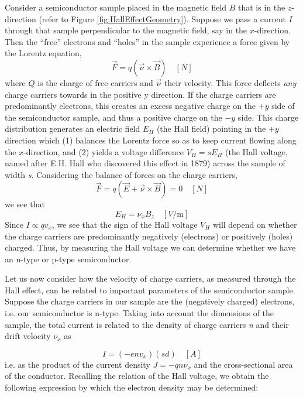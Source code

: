 \documentclass{../lab}
\begin{document}
Consider a semiconductor sample placed in the magnetic field $B$ that is in the $z$-direction (refer to Figure \ref{fig:HallEffectGeometry}). Suppose we pass a current $I$ through that sample perpendicular to the magnetic field, say in the $x$-direction. Then the ``free'' electrons and ``holes'' in the sample experience a force given by the Lorentz equation,
\begin{equation}
    \vec{F}=q(\vec{\nu}\times\vec{B}) \quad [N]
\end{equation}
where $Q$ is the charge of free carriers and $ \vec{\nu} $ their velocity. This force deflects \emph{any} charge carriers towards in the positive y direction. If the charge carriers are predominantly electrons, this creates an excess negative charge on the $+y$ side of the semiconductor sample, and thus a positive charge on the $-y$ side. This charge distribution generates an electric field $ E_H $ (the Hall field) pointing in the $+y$ direction which (1) balances the Lorentz force so as to keep current flowing along the $x$-direction, and (2) yields a voltage difference $ V_H=sE_H $ (the Hall voltage, named after E.H. Hall who discovered this effect in 1879) across the sample of width \emph{s}. Considering the balance of forces on the charge carriers,
\begin{equation}
    \vec{F}=q(\vec{E}+\vec{\nu}\times\vec{B})=0 \quad [N]
\end{equation}
we see that
\begin{equation}
    E_H=\nu_xB_z \quad [V/\text{m}]
\end{equation}
Since $ I\propto qv_x $, we see that the sign of the Hall voltage $ V_H $ will depend on whether the charge carriers are predominantly negatively (electrons) or positively (holes) charged. Thus, by measuring the Hall voltage we can determine whether we have an n-type or p-type semiconductor.

Let us now consider how the velocity of charge carriers, as measured through the Hall effect, can be related to important parameters of the semiconductor sample. Suppose the charge carriers in our sample are the (negatively charged) electrons, i.e. our semiconductor is n-type. Taking into account the dimensions of the sample, the total current is related to the density of charge carriers \emph{n} and their drift velocity $ \nu_x $ as

\begin{equation}
    I=(-env_x)(sd) \quad [A]
\end{equation}
i.e. as the product of the current density $ J=-qn\nu_x $ and the cross-sectional area of the conductor. Recalling the relation of the Hall voltage, we obtain the following expression by which the electron density may be determined:
\end{document}
